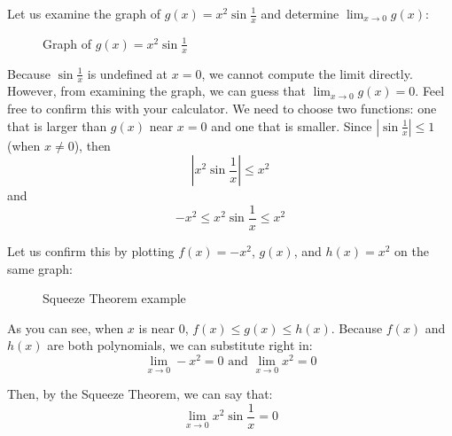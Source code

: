 \begin{Worked}
\begin{Problem}
Let us examine the graph of $g(x) = x^2\sin{\frac{1}{x}}$ and determine $\lim_{x \to 
0}g(x)$:

\begin{figure}[H]
\centering
{}
\caption{Graph of $g(x) = x^2\sin{\frac{1}{x}}$}
\end{figure}
\end{Problem}
\begin{Solution}
Because $\sin{\frac{1}{x}}$ is undefined at $x=0$, we cannot 
compute the limit directly. However, from examining the graph, we can guess 
that $\lim_{x \to 0} g(x) = 0$. Feel free to confirm this with your calculator. 
We need to choose two functions: one that is larger than $g(x)$ near $x = 0$ 
and one that is smaller. Since $|\sin{\frac{1}{x}}|\leq 1$ (when $x \neq 0$), 
then $$|x^2 \sin{\frac{1}{x}}| \leq x^2$$ and $$-x^2 \leq x^2 \sin{\frac{1}{x}} 
\leq x^2$$

Let us confirm this by plotting $f(x)=-x^2$, $g(x)$, and $h(x)=x^2$ on the same 
graph:

\begin{figure}[H]
\centering

\caption{Squeeze Theorem example}
\end{figure}

As you can see, when $x$ is near $0$, $f(x) \leq g(x) \leq h(x)$. Because $f(x)$ 
and $h(x)$ are both polynomials, we can substitute right in: $$\lim_{x \to 
0}-x^2 = 0 \text{ and } \lim_{x \to 0}x^2 = 0$$

Then, by the Squeeze Theorem, we can say that: $$\lim_{x \to 0}x^2\sin{\frac{1}{x}}
=0$$
\end{Solution}
\end{Worked}

